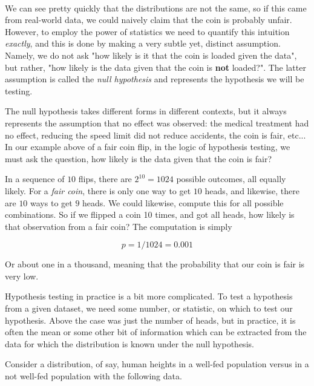 \documentclass[11pt]{article}
\begin{document}
    \begin{center}
    \end{center}
    { \hspace*{\fill} \\}
    
    We can see pretty quickly that the distributions are not the same, so if
this came from real-world data, we could naively claim that the coin is
probably unfair. However, to employ the power of statistics we need to
quantify this intuition \emph{exactly}, and this is done by making a
very subtle yet, distinct assumption. Namely, we do not ask "how likely
is it that the coin is loaded given the data", but rather, "how likely
is the data given that the coin is \textbf{not} loaded?". The latter
assumption is called the \emph{null hypothesis} and represents the
hypothesis we will be testing.

The null hypothesis takes different forms in different contexts, but it
always represents the assumption that no effect was observed: the
medical treatment had no effect, reducing the speed limit did not reduce
accidents, the coin is fair, etc... In our example above of a fair coin
flip, in the logic of hypothesis testing, we must ask the question, how
likely is the data given that the coin is fair?

In a sequence of \(10\) flips, there are \(2^{10} = 1024\) possible
outcomes, all equally likely. For a \emph{fair coin}, there is only one
way to get \(10\) heads, and likewise, there are \(10\) ways to get
\(9\) heads. We could likewise, compute this for all possible
combinations. So if we flipped a coin 10 times, and got all heads, how
likely is that observation from a fair coin? The computation is simply

\[p = 1/1024 = 0.001\]

Or about one in a thousand, meaning that the probability that our coin
is fair is very low.

Hypothesis testing in practice is a bit more complicated. To test a
hypothesis from a given dataset, we need some number, or statistic, on
which to test our hypothesis. Above the case was just the number of
heads, but in practice, it is often the mean or some other bit of
information which can be extracted from the data for which the
distribution is known under the null hypothesis.

Consider a distribution, of say, human heights in a well-fed population
versus in a not well-fed population with the following data.
\end{document}
